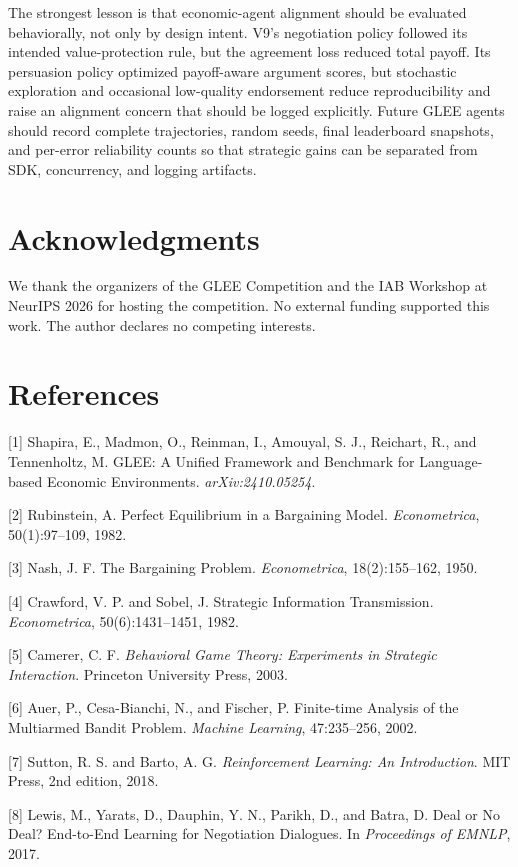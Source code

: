 \documentclass{article}
\begin{document}
The strongest lesson is that economic-agent alignment should be evaluated behaviorally, not only by design intent. V9's negotiation policy followed its intended value-protection rule, but the agreement loss reduced total payoff. Its persuasion policy optimized payoff-aware argument scores, but stochastic exploration and occasional low-quality endorsement reduce reproducibility and raise an alignment concern that should be logged explicitly. Future GLEE agents should record complete trajectories, random seeds, final leaderboard snapshots, and per-error reliability counts so that strategic gains can be separated from SDK, concurrency, and logging artifacts.

\section*{Acknowledgments}
We thank the organizers of the GLEE Competition and the IAB Workshop at NeurIPS 2026 for hosting the competition. No external funding supported this work. The author declares no competing interests.

\section*{References}
\small

[1] Shapira, E., Madmon, O., Reinman, I., Amouyal, S. J., Reichart, R., and Tennenholtz, M. GLEE: A Unified Framework and Benchmark for Language-based Economic Environments. \emph{arXiv:2410.05254}.

[2] Rubinstein, A. Perfect Equilibrium in a Bargaining Model. \emph{Econometrica}, 50(1):97--109, 1982.

[3] Nash, J. F. The Bargaining Problem. \emph{Econometrica}, 18(2):155--162, 1950.

[4] Crawford, V. P. and Sobel, J. Strategic Information Transmission. \emph{Econometrica}, 50(6):1431--1451, 1982.

[5] Camerer, C. F. \emph{Behavioral Game Theory: Experiments in Strategic Interaction}. Princeton University Press, 2003.

[6] Auer, P., Cesa-Bianchi, N., and Fischer, P. Finite-time Analysis of the Multiarmed Bandit Problem. \emph{Machine Learning}, 47:235--256, 2002.

[7] Sutton, R. S. and Barto, A. G. \emph{Reinforcement Learning: An Introduction}. MIT Press, 2nd edition, 2018.

[8] Lewis, M., Yarats, D., Dauphin, Y. N., Parikh, D., and Batra, D. Deal or No Deal? End-to-End Learning for Negotiation Dialogues. In \emph{Proceedings of EMNLP}, 2017.
\end{document}
